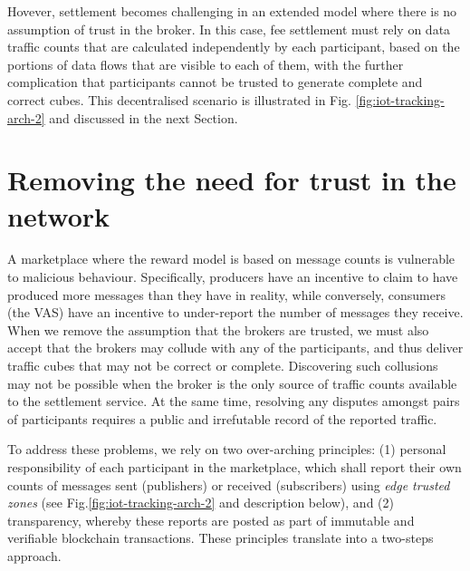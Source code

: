\documentclass[chi_draft]{sigchi}
\begin{document}
Hovever, settlement becomes challenging in an extended model where there is no assumption of trust in the broker.
In this case, fee settlement must rely on data traffic counts that are calculated independently by each participant, based on the portions of data flows that are visible to each of them, with the 
further complication that participants cannot be trusted to generate complete and correct cubes.
This decentralised scenario is illustrated in Fig. \ref{fig:iot-tracking-arch-2} and discussed in the next Section.

\section{Removing the need  for trust in the network}  \label{sec:no-trust}

A marketplace where the reward model is based on message counts is vulnerable to malicious behaviour.
Specifically, producers have an incentive to claim to have produced more messages than they have in reality, while conversely, consumers (the VAS) have an incentive to under-report the number of messages they receive.
%
When we remove the assumption that the brokers are trusted, we must also accept that the brokers may collude with any of the participants, and thus deliver traffic cubes that may not be correct or complete.
Discovering such collusions may not be possible when the broker is the only source of traffic counts available to the settlement service.  At the same time, resolving any disputes amongst pairs of participants requires a public and irrefutable record of the reported traffic.

To address these problems, we rely on two over-arching principles: (1) personal responsibility of each participant in the marketplace, which shall report their own counts of messages sent (publishers) or received (subscribers) using \textit{edge trusted zones} (see Fig.\ref{fig:iot-tracking-arch-2} and description below),
 and (2) transparency, whereby these reports are posted as part of immutable and verifiable blockchain transactions.
These principles translate into a two-steps approach.
%
\end{document}

